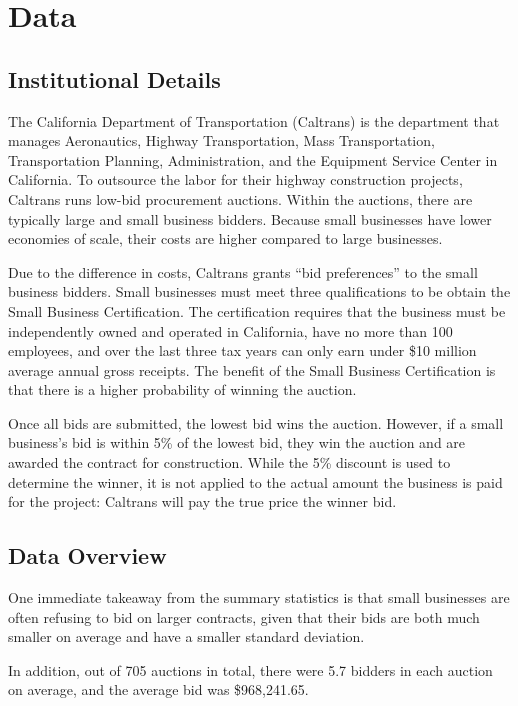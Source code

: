 \section{Data}

\subsection{Institutional Details}

The California Department of Transportation (Caltrans) is the department that
manages Aeronautics, Highway Transportation, Mass Transportation,
Transportation Planning, Administration, and the Equipment Service Center in
California. To outsource the labor for their highway construction projects,
Caltrans runs low-bid procurement auctions. Within the auctions, there are
typically large and small business bidders. Because small businesses have lower
economies of scale, their costs are higher compared to large businesses.

Due to the difference in costs, Caltrans grants ``bid preferences'' to the small
business bidders. Small businesses must meet three qualifications to be obtain
the Small Business Certification. The certification requires that the business
must be independently owned and operated in California, have no more than 100
employees, and over the last three tax years can only earn under \$10 million
average annual gross receipts. The benefit of the Small Business Certification
is that there is a higher probability of winning the auction.

Once all bids are submitted, the lowest bid wins the auction. However, if a
small business’s bid is within 5\% of the lowest bid, they win the auction and
are awarded the contract for construction. While the 5\% discount is used to
determine the winner, it is not applied to the actual amount the business is
paid for the project: Caltrans will pay the true price the winner bid.

\subsection{Data Overview}



One immediate takeaway from the summary statistics is that small businesses are often
refusing to bid on larger contracts, given that their bids are both
much smaller on average and have a smaller standard deviation.

In addition, out of 705 auctions in total, there were 5.7 bidders in
each auction on average, and the average bid was \$968,241.65.

